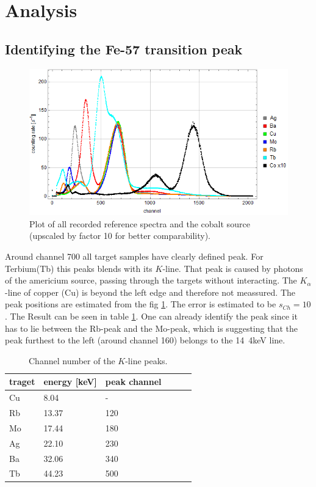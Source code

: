 \section{Analysis}
\subsection{Identifying the Fe-57 transition peak}
\begin{figure}[H]
\centering
\includegraphics[width=1\linewidth]{../results/calibration/spectra}
\caption[Reference spectra]{Plot of all recorded reference spectra and the cobalt source (upscaled by factor 10 for better comparability).}
\label{fig:analysis:spectra}
\end{figure}
Around channel 700 all target samples have clearly defined peak. For Terbium(Tb) this peaks blends with its $K$-line. That peak is caused by photons of the americium source, passing through the targets without interacting. The $K_\alpha$-line of copper (Cu) is beyond the left edge and therefore not meassured. The peak positions are estimated from the fig \ref{fig:analysis:spectra}. The error is estimated to be $s_{Ch}=10$. The Result can be seen in table \ref{tb:analysis:peakpos}. One can already identify the peak since it has to lie between the Rb-peak and the Mo-peak, which is suggesting that the peak furthest to the left (around channel 160) belongs to the \unit{14.4}{keV} line.

\begin{table}[H]\centering
	\begin{tabular}{@{}llllll@{}}
		\toprule
		 traget & energy [keV]& peak channel  \\
		\midrule
		Cu & 8.04 & - \\
		Rb & 13.37 & 120 \\
		Mo & 17.44 & 180 \\
		Ag & 22.10 & 230 \\
		Ba & 32.06 & 340 \\
		Tb & 44.23 & 500\\
		\bottomrule
	\end{tabular}
	\caption[Peak positions]{Channel number of the $K$-line peaks.}
	\label{tb:analysis:peakpos}
\end{table}

